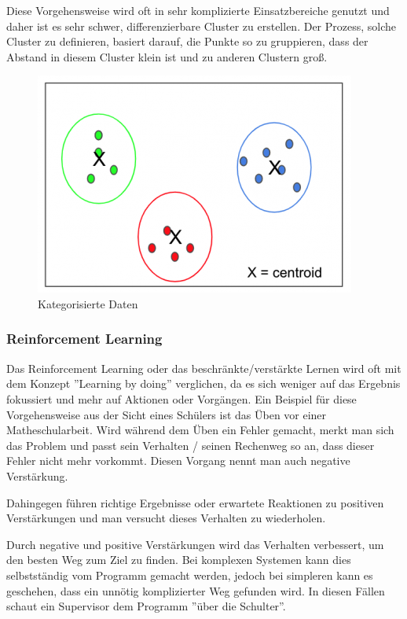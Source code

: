 Diese Vorgehensweise wird oft in sehr komplizierte Einsatzbereiche genutzt und daher ist es sehr schwer, differenzierbare Cluster zu erstellen. Der Prozess, solche Cluster zu definieren, basiert darauf, die Punkte so zu gruppieren, dass der Abstand in diesem Cluster klein ist und zu anderen Clustern groß.

\begin{figure}[H]
      \centering
      \includegraphics[scale=0.8]{sections/machine-learning/images/clustered-data.png}
      \caption{Kategorisierte Daten}
      \label{fig:clustered-data}
\end{figure}

\subsubsection{Reinforcement Learning}

Das Reinforcement Learning oder das beschränkte/verstärkte Lernen wird oft mit dem Konzept ''Learning by doing'' verglichen, da es sich weniger auf das Ergebnis fokussiert und mehr auf Aktionen oder Vorgängen. Ein Beispiel für diese Vorgehensweise aus der Sicht eines Schülers ist das Üben vor einer Matheschularbeit. Wird während dem Üben ein Fehler gemacht, merkt man sich das Problem und passt sein Verhalten / seinen Rechenweg so an, dass dieser Fehler nicht mehr vorkommt. Diesen Vorgang nennt man auch negative Verstärkung. \cite{SL:online}

Dahingegen führen richtige Ergebnisse oder erwartete Reaktionen zu positiven Verstärkungen und man versucht dieses Verhalten zu wiederholen.

Durch negative und positive Verstärkungen wird das Verhalten verbessert, um den besten Weg zum Ziel zu finden. Bei komplexen Systemen kann dies selbstständig vom Programm gemacht werden, jedoch bei simpleren kann es geschehen, dass ein unnötig komplizierter Weg gefunden wird. In diesen Fällen schaut ein Supervisor dem Programm ''über die Schulter''.